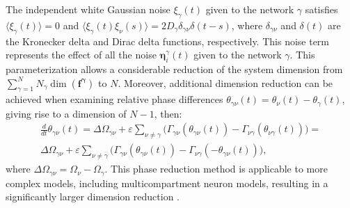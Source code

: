 \documentclass[../main.tex]{subfiles}
\begin{document}
The independent white Gaussian noise $\xi_\gamma(t)$ given to the network $\gamma$ satisfies $\langle \xi_\gamma(t)\rangle = 0$ and $\langle \xi_\gamma(t)\xi_\nu(s) \rangle = 2D_\gamma\delta_{\gamma\nu}\delta(t-s)$,
where $\delta_{\gamma\nu}$ and $\delta(t)$ are the Kronecker delta and Dirac delta functions, respectively.
This noise term represents the effect of all the noise $\mathbf{\eta}_i^\gamma(t)$ given to the network $\gamma$.
This parameterization allows a considerable reduction of the system dimension from $\sum_{\gamma=1}^{N}N_{\gamma}\dim(\mathbf{f^\gamma})$ to $N$.
Moreover, additional dimension reduction can be achieved when examining relative phase differences $\theta_{\gamma\nu}(t) = \theta_\nu(t) -\theta_\gamma(t)$, giving rise to a dimension of $N-1$, then:
\begin{equation}
    \begin{aligned}
    \displaystyle\frac{d}{dt}\theta_{\gamma\nu}(t) = \Delta\Omega_{\gamma\nu}+\varepsilon\displaystyle\sum_{\nu\neq\gamma}\Big( \Gamma_{\gamma\nu}(\theta_{\gamma\nu}(t))-\Gamma_{\nu\gamma}(\theta_{\nu\gamma}(t))\Big) = \\
    \Delta\Omega_{\gamma\nu}+\varepsilon\displaystyle\sum_{\nu\neq\gamma}\Big( \Gamma_{\gamma\nu} (\theta_{\gamma\nu}(t))-\Gamma_{\nu\gamma}(-\theta_{\gamma\nu}(t))\Big),
    \label{eq:phase-reduction-4_}
    \end{aligned}
\end{equation}
where $\Delta\Omega_{\gamma\nu} = \Omega_\nu-\Omega_\gamma$.
This phase reduction method is applicable to more complex models, including multicompartment neuron models, resulting in a significantly larger dimension reduction \citep{zahid2009predicting,lewis2013cooperative}.
\end{document}
